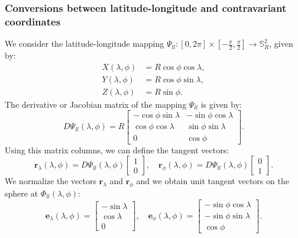 \subsubsection{Conversions between latitude-longitude and contravariant coordinates}
\label{anexo-sph-ll}
We consider the latitude-longitude mapping 
$\Psi_{ll}: [0,2\pi] \times [-\frac{\pi}{2},\frac{\pi}{2}] \to \mathbb{S}^2_R$, given by:
\begin{align}
	\label{ll2sph}
	X(\lambda,\phi) &= R\cos \phi \cos \lambda,\\
	Y(\lambda,\phi) &= R\cos \phi \sin \lambda,\\
	Z(\lambda,\phi) &= R\sin \phi.
\end{align}
The derivative or Jacobian matrix of the mapping $\Psi_{ll}$ is given by:
\begin{equation}
	\label{dpsi}
	D\Psi_{ll} (\lambda,\phi) = 
	R \begin{bmatrix}
		  -\cos \phi \sin \lambda &  -\sin \phi \cos \lambda \\
		   \cos \phi \cos \lambda & \sin \phi \sin \lambda \\
		  0  &  \cos \phi
	\end{bmatrix}.
\end{equation}
Using this matrix columns, we can define the tangent vectors:
\begin{equation}
	\boldsymbol{r}_{\lambda}(\lambda,\phi) = D\Psi_{ll}(\lambda,\phi)
	\begin{bmatrix}
		 1 \\
		 0
	\end{bmatrix}, \quad
	\boldsymbol{r}_{\phi}(\lambda,\phi) = D\Psi_{ll}(\lambda,\phi)
	\begin{bmatrix}
		 0 \\
		 1
	\end{bmatrix}.
\end{equation}
We normalize the vectors $\boldsymbol{r}_\lambda$ and $\boldsymbol{r}_\phi$
and we obtain unit tangent vectors on the sphere at $\Phi_{ll}(\lambda, \phi)$:
\begin{equation}
	\label{latlon_tg_vectors}
	\boldsymbol{e}_{\lambda}(\lambda,\phi) = 
	\begin{bmatrix}
		 -\sin \lambda \\
		  \cos \lambda \\
		  0
	\end{bmatrix}, \quad
	\boldsymbol{e}_{\phi}(\lambda,\phi) =
	\begin{bmatrix}
		 -\sin \phi \cos \lambda \\
		 -\sin \phi \sin \lambda \\
			  \cos \phi
	\end{bmatrix}.
\end{equation}
